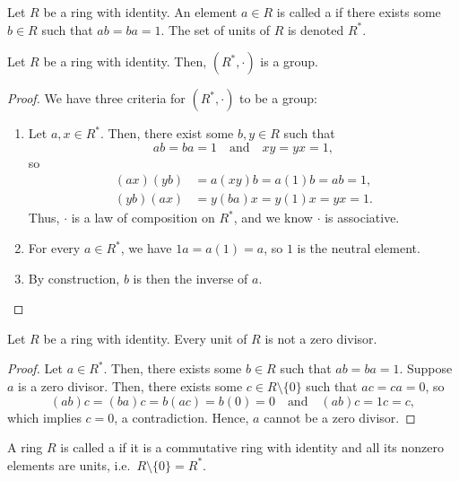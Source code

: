 \begin{defn}
Let $ R $ be a ring with identity. An element $ a\in R $ is called a  if there exists some $ b\in R $ such that $ ab=ba=1 $. The set of units of $ R $ is denoted $ R^* $.
\end{defn}

\begin{prop}
Let $ R $ be a ring with identity. Then, $ (R^*,\cdot) $ is a group.
\end{prop}
\begin{proof}
We have three criteria for $ (R^*,\cdot) $ to be a group:
\begin{enumerate}
    \item Let $ a,x\in R^* $. Then, there exist some $ b,y\in R $ such that
    \begin{equation*}
        ab=ba=1 \quad\text{and}\quad xy=yx=1,
    \end{equation*}
    so
    \begin{align*}
        (ax)(yb) &= a(xy)b=a(1)b=ab=1, \\
        (yb)(ax) &= y(ba)x=y(1)x=yx=1.
    \end{align*}
    Thus, $ \cdot $ is a law of composition on $ R^* $, and we know $ \cdot $ is associative.

    \item For every $ a\in R^* $, we have $ 1 a=a(1)=a $, so $ 1 $ is the neutral element.
    
    \item By construction, $ b $ is then the inverse of $ a $.\qedhere
\end{enumerate}
\end{proof}

\begin{prop}
Let $ R $ be a ring with identity. Every unit of $ R $ is not a zero divisor.
\end{prop}
\begin{proof}
Let $ a\in R^* $. Then, there exists some $ b\in R $ such that $ ab=ba=1 $. Suppose $ a $ is a zero divisor. Then, there exists some $ c\in R\setminus\{0\} $ such that $ ac=ca=0 $, so
\begin{equation*}
    (ab)c=(ba)c=b(ac)=b(0)=0 \quad\text{and}\quad (ab)c=1c=c,
\end{equation*}
which implies $ c=0 $, a contradiction. Hence, $ a $ cannot be a zero divisor.
\end{proof}

\begin{defn}
A ring $ R $ is called a  if it is a commutative ring with identity and all its nonzero elements are units, i.e.\ $ R\setminus\{0\}=R^* $.
\end{defn}

